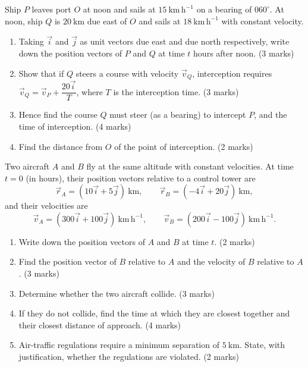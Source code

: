 \documentclass[11pt]{article}
\newcounter{popsec}
\newcounter{popsub}
\newcommand{\courssub}[1]{%
  \stepcounter{popsub}%
  \par\vspace{9pt}\noindent{\popxbold\fontsize{11.5}{13}\selectfont\color{popink}{\color{poporange}\thepopsec.\thepopsub}\hspace{6pt}#1}\par\nopagebreak\vspace{4pt}
}
\begin{document}
\courssub{I prepare for the GCE}

\begin{exercice}
Ship $P$ leaves port $O$ at noon and sails at $15\ \mathrm{km\,h^{-1}}$ on a bearing of $060^{\circ}$. At noon, ship $Q$ is $20\ \mathrm{km}$ due east of $O$ and sails at $18\ \mathrm{km\,h^{-1}}$ with constant velocity.
\begin{enumerate}
\item Taking $\vec{i}$ and $\vec{j}$ as unit vectors due east and due north respectively, write down the position vectors of $P$ and $Q$ at time $t$ hours after noon. \hfill (3 marks)
\item Show that if $Q$ steers a course with velocity $\vec{v}_Q$, interception requires $\vec{v}_Q = \vec{v}_P + \dfrac{20\vec{i}}{T}$, where $T$ is the interception time. \hfill (3 marks)
\item Hence find the course $Q$ must steer (as a bearing) to intercept $P$, and the time of interception. \hfill (4 marks)
\item Find the distance from $O$ of the point of interception. \hfill (2 marks)
\end{enumerate}
\end{exercice}

\begin{exercice}
Two aircraft $A$ and $B$ fly at the same altitude with constant velocities. At time $t = 0$ (in hours), their position vectors relative to a control tower are
\[
\vec{r}_A = (10\vec{i} + 5\vec{j})\ \mathrm{km}, \qquad \vec{r}_B = (-4\vec{i} + 20\vec{j})\ \mathrm{km},
\]
and their velocities are
\[
\vec{v}_A = (300\vec{i} + 100\vec{j})\ \mathrm{km\,h^{-1}}, \qquad \vec{v}_B = (200\vec{i} - 100\vec{j})\ \mathrm{km\,h^{-1}}.
\]
\begin{enumerate}
\item Write down the position vectors of $A$ and $B$ at time $t$. \hfill (2 marks)
\item Find the position vector of $B$ relative to $A$ and the velocity of $B$ relative to $A$. \hfill (3 marks)
\item Determine whether the two aircraft collide. \hfill (3 marks)
\item If they do not collide, find the time at which they are closest together and their closest distance of approach. \hfill (4 marks)
\item Air-traffic regulations require a minimum separation of $5\ \mathrm{km}$. State, with justification, whether the regulations are violated. \hfill (2 marks)
\end{enumerate}
\end{exercice}
\end{document}
